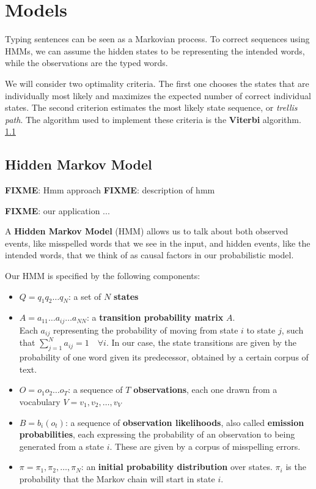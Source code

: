 \chapter{Models}

Typing sentences can be seen as a Markovian process. To correct sequences using HMMs, we can assume the 
hidden states to be representing the intended words, while the observations are the typed words.

We will consider two optimality criteria. The first one chooses the states that are individually most likely and 
maximizes the expected number of correct individual states. The second criterion estimates the most likely 
state sequence, or \textit{trellis path}. The algorithm used to implement these criteria is the \textbf{Viterbi} 
algorithm. \ref{}

\section{Hidden Markov Model}

\textbf{FIXME}: Hmm approach
\textbf{FIXME}: description of hmm

\textbf{FIXME}: our application ...

A \textbf{Hidden Markov Model} (HMM) allows us to talk about both observed events, like misspelled words that 
we see in the input, and hidden events, like the intended words, that we think of as causal factors in our 
probabilistic model. 

Our HMM is specified by the following components:
\begin{itemize}
	\item $Q = q_1q_2 \dots q_N$: a set of $N$ \textbf{states}
	\item $A=a_{11}	\dots a_{ij} \dots a_{NN}$: a \textbf{transition probability matrix} $A$. \\ Each $a_{ij}$ 
	representing the probability of moving from state $i$ to state $j$, such that $\sum_{j=1}^N a_{ij}=1 \quad 
	\forall i$. In our case, the state transitions are given by the probability of one word given its predecessor, 
	obtained by a certain corpus of text.
	\item $O = o_1o_2 \dots o_T$: a sequence of $T$ \textbf{observations}, each one drawn from a vocabulary 
	$V = v_1,v_2,\dots,v_V$
	\item $B = b_i (o_t )$: a sequence of \textbf{observation likelihoods}, also called \textbf{emission 
	probabilities}, each expressing the probability of an observation to being generated from a state $i$. These 
	are given by a corpus of misspelling errors.
	\item $\pi = \pi_1,\pi_2,\dots,\pi_N$: an \textbf{initial probability distribution} over states. $\pi_i$ is the 
	probability that the Markov chain will start in state $i$. 
\end{itemize}

